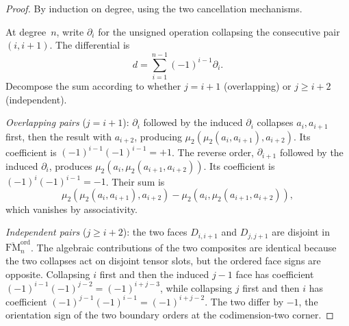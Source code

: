 \begin{proof}
By induction on degree, using the two cancellation mechanisms.

At degree~$n$, write \(\partial_i\) for the unsigned operation
collapsing the consecutive pair \((i,i+1)\). The differential is
\[
d=\sum_{i=1}^{n-1}(-1)^{i-1}\partial_i .
\]
Decompose the sum according to whether $j=i+1$
(overlapping) or $j\ge i+2$ (independent).

\emph{Overlapping pairs} ($j=i+1$):
\(\partial_i\) followed by the induced \(\partial_i\) collapses
$a_i,a_{i+1}$ first, then the result with $a_{i+2}$,
producing \(\mu_2(\mu_2(a_i,a_{i+1}),a_{i+2})\).
Its coefficient is \((-1)^{i-1}(-1)^{i-1}=+1\). The reverse order,
\(\partial_{i+1}\) followed by the induced \(\partial_i\), produces
\(\mu_2(a_i,\mu_2(a_{i+1},a_{i+2}))\).
Its coefficient is \((-1)^i(-1)^{i-1}=-1\). Their sum is
\[
\mu_2(\mu_2(a_i,a_{i+1}),a_{i+2})
-\mu_2(a_i,\mu_2(a_{i+1},a_{i+2})),
\]
which vanishes by associativity.

\emph{Independent pairs} ($j\ge i+2$):
the two faces $D_{i,i+1}$ and $D_{j,j+1}$ are disjoint
in $\overline{\mathrm{FM}}_n^{\mathrm{ord}}$. The algebraic
contributions of the two composites are identical because the two
collapses act on disjoint tensor slots, but
the ordered face signs are opposite. Collapsing \(i\) first and then
the induced \(j-1\) face has coefficient
\((-1)^{i-1}(-1)^{j-2}=(-1)^{i+j-3}\), while collapsing \(j\) first
and then \(i\) has coefficient
\((-1)^{j-1}(-1)^{i-1}=(-1)^{i+j-2}\). The two differ by \(-1\), the
orientation sign of the two boundary orders at the codimension-two
corner.
\end{proof}

